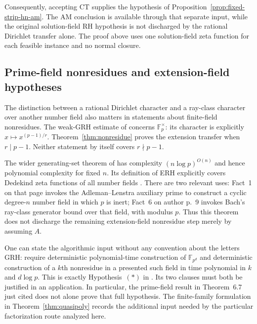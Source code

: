 \documentclass[11pt]{article}
\theoremstyle{definition}
\theoremstyle{remark}
\begin{document}
Consequently, accepting \(\mathrm{CT}\) supplies the hypothesis
of Proposition~\ref{prop:fixed-strip-hn-am}.  The AM conclusion is
available through that separate input, while the original
solution-field RH hypothesis is not discharged by the rational
Dirichlet transfer alone.  The proof above uses one solution-field
zeta function for each feasible instance and no normal closure.

\subsection{Prime-field nonresidues and extension-field hypotheses}
The distinction between a rational Dirichlet character and a ray-class
character over another number field also matters in statements about
finite-field nonresidues.  The weak-GRH estimate of
\citet[Theorem~6.7, p.~8]{BhargavaEtAl2017} concerns
$\mathbb F_p^\times$: its character is explicitly
$x\mapsto x^{(p-1)/r}$.  Theorem~\ref{thm:nonresidue} proves the
extension transfer when $r\mid p-1$.  Neither statement by itself
covers $r\nmid p-1$.

The wider generating-set theorem of
\citet[author pp.~2--3]{BuchmannShoup1996} has complexity
$(n\log p)^{O(n)}$ and hence polynomial complexity for fixed $n$.
Its definition of ERH explicitly covers Dedekind zeta functions of
all number fields \citep[author p.~5]{BuchmannShoup1996}.
There are two relevant uses: Fact~1 on that page invokes the
Adleman--Lenstra auxiliary prime to construct a cyclic degree-$n$
number field in which $p$ is inert; Fact~6 on author p.~9 invokes
Bach's ray-class generator bound over that field, with modulus $p$.
Thus this theorem does not discharge the remaining extension-field
nonresidue step merely by assuming $A$.

One can state the algorithmic input without any convention about the
letters GRH: require deterministic polynomial-time construction of
$\mathbb F_{p^d}$ and deterministic construction of a $k$th nonresidue
in a presented such field in time polynomial in $k$ and $d\log p$.
This is exactly Hypothesis~$(*)$ in
\citet[\S1.1, p.~3]{Guo2017Thesis}.  Its two clauses must both be
justified in an application.  In particular, the prime-field result
in Theorem~6.7 just cited does not alone prove that full hypothesis.
The finite-family formulation in Theorem~\ref{thm:quasipoly}
records the additional input needed by the particular factorization
route analyzed here.
\end{document}
